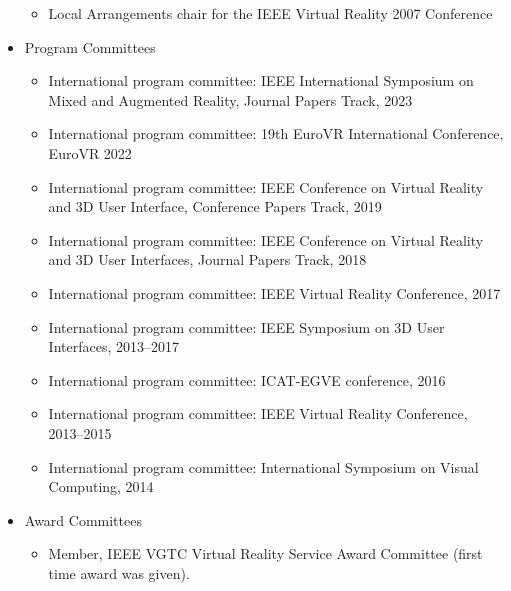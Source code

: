 \documentclass[wideaddress]{vitae}
\begin{document}
\begin{itemize}
\begin{itemize}
			\item{Local Arrangements chair for the IEEE Virtual Reality 2007 Conference}
		\end{itemize}
	\item{Program Committees}
		\begin{itemize}
			\item{International program committee: IEEE International Symposium on Mixed and Augmented Reality, Journal Papers Track, 2023}
			\item{International program committee: 19th EuroVR International Conference, EuroVR 2022}
			\item{International program committee: IEEE Conference on Virtual Reality and 3D User Interface, Conference Papers Track, 2019}
			\item{International program committee: IEEE Conference on Virtual Reality and 3D User Interfaces, Journal Papers Track, 2018}
			\item{International program committee: IEEE Virtual Reality Conference, 2017}
			\item{International program committee: IEEE Symposium on 3D User Interfaces, 2013--2017}
			\item{International program committee: ICAT-EGVE conference, 2016}
			\item{International program committee: IEEE Virtual Reality Conference, 2013--2015}
			\item{International program committee: International Symposium on Visual Computing, 2014}
		\end{itemize}
    \item Award Committees
        \begin{itemize}
            \item Member, IEEE VGTC Virtual Reality Service Award Committee (first time award was given).
        \end{itemize}
            

\end{itemize}
\end{document}
